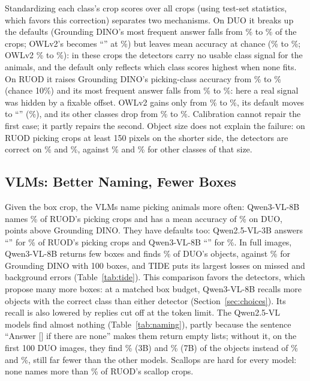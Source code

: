 \documentclass[letterpaper]{article} %
\begin{document}
Standardizing each class's crop scores over all crops (using test-set statistics, which favors this correction) separates two mechanisms. On DUO it breaks up the defaults (Grounding DINO's most frequent answer falls from \dlDuoGD\% to \calDuoTopGD\% of the crops; OWLv2's becomes ``\calDuoTopLabOWL'' at \calDuoTopOWL\%) but leaves mean accuracy at chance (\calDuoRawGD\% to \calDuoGD\%; OWLv2 \calDuoRawOWL\% to \calDuoOWL\%): in these crops the detectors carry no usable class signal for the animals, and the default only reflects which class scores highest when none fits. On RUOD it raises Grounding DINO's picking-class accuracy from \calRuodRawGD\% to \calRuodGD\% \calRuodciGD{} (chance 10\%) and its most frequent answer falls from \dlRuodGD\% to \calRuodTopGD\%: here a real signal was hidden by a fixable offset. OWLv2 gains only from \calRuodRawOWL\% to \calRuodOWL\%, its default moves to ``\calRuodTopLabOWL'' (\calRuodTopOWL\%), and its other classes drop from \calRuodOthRawOWL\% to \calRuodOthOWL\%. Calibration cannot repair the first case; it partly repairs the second. Object size does not explain the failure: on RUOD picking crops at least 150 pixels on the shorter side, the detectors are correct on \rBigSeaGD\% and \rBigSeaOWL\%, against \rBigOthGD\% and \rBigOthOWL\% for other classes of that size.

\subsection{VLMs: Better Naming, Fewer Boxes}
\label{sec:vlm}

Given the box crop, the VLMs name picking animals more often: Qwen3-VL-8B names \rCropSeaQwenVL\% \rCropSeaciQwenVL{} of RUOD's picking crops and has a mean accuracy of \cropQwenVL\% on DUO, \cropdGD{} points \cropdciGD{} above Grounding DINO. They have defaults too: Qwen2.5-VL-3B answers ``\dlRuodLabQThree'' for \dlRuodQThree\% of RUOD's picking crops and Qwen3-VL-8B ``\dlRuodLabQwenVL'' for \dlRuodQwenVL\%. In full images, Qwen3-VL-8B returns few boxes and finds \foundQwenVL\% of DUO's objects, against \foundGD\% for Grounding DINO with 100 boxes, and TIDE puts its largest losses on missed and background errors (Table~\ref{tab:tide}). This comparison favors the detectors, which propose many more boxes: at a matched box budget, Qwen3-VL-8B recalls more objects with the correct class than either detector (Section~\ref{sec:choices}). Its recall is also lowered by replies cut off at the token limit. The Qwen2.5-VL models find almost nothing (Table~\ref{tab:naming}), partly because the sentence ``Answer [] if there are none'' makes them return empty lists; without it, on the first 100 DUO images, they find \neFoundQThree\% (3B) and \neFoundQSeven\% (7B) of the objects instead of \neFoundDefQThree\% and \neFoundDefQSeven\%, still far fewer than the other models. Scallops are hard for every model: none names more than \rCropScalMax\% of RUOD's scallop crops.
\end{document}
